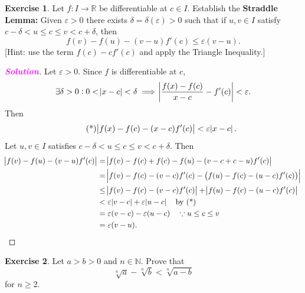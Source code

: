 \documentclass[12pt,openany]{book}
\theoremstyle{definition}
\newtheorem{exercise}{Exercise}[chapter]
\newcommand{\N}{\mathbb{N}}
\newcommand{\R}{\mathbb{R}}
\newcommand{\sol}{\textcolor{magenta}{\bf Solution}}
\begin{document}
	\vspace{20pt}
	\begin{tcolorbox}[colframe=execolor, title={\color{white}\bf}]
		\begin{exercise}
			Let $f:I\to\R$ be differentiable at $c\in I$. Establish the \textbf{Straddle Lemma:}
			Given $\varepsilon>0$ there exists $\delta=\delta(\varepsilon)>0$ such that if $u,v\in I$ satisfy $c-\delta<u\leq c\leq v<c+\delta$, then
			\[
			f(v)-f(u)-(v-u)f'(c)\leq\varepsilon(v-u).
			\]
			\textcolor{gray!50!white}{[Hint: use the term $f(c)-cf'(c)$ and apply the Triangle Inequality.]}
		\end{exercise}
	\end{tcolorbox}
	\begin{proof}[\sol]
		Let $\varepsilon>0$. Since $f$ is differentiable at $c$, \[
		\exists\delta>0: 0<\abs{x-c}<\delta\implies\abs{\frac{f(x)-f(c)}{x-c}-f'(c)}<\varepsilon.
		\] Then \begin{equation*}\tag{*}
		\abs{f(x)-f(c)-(x-c)f'(c)}<\varepsilon\abs{x-c}.
		\end{equation*}
		Let $u,v\in I$ satisfies $c-\delta<u\leq c\leq v<c+\delta$. Then \begin{align*}
			\abs{f(v)-f(u)-(v-u)f'(c)}&=\abs{f(v)-f(c)+f(c)-f(u)-(v-c+c-u)f'(c)}\\
			&=\abs{f(v)-f(c)-(v-c)f'(c)-\del{f(u)-f(c)-(u-c)f'(c)}}\\
			&\leq\abs{f(v)-f(c)-(v-c)f'(c)}+\abs{f(u)-f(c)-(u-c)f'(c)}\\
			&<\varepsilon\abs{v-c}+\varepsilon\abs{u-c}\quad\text{by (*)}\\
			&=\varepsilon(v-c)-\varepsilon(u-c)\quad\because u\leq c\leq v\\
			&=\varepsilon(v-u).
		\end{align*}
	\end{proof}
	\vspace{20pt}
	\newpage
	\begin{tcolorbox}[colframe=execolor, title={\color{white}\bf}]
	\begin{exercise}
		Let $a>b>0$ and $n\in\N$. Prove that \[
		\sqrt[n]{a}-\sqrt[n]{b}<\sqrt[n]{a-b}
		\] for $n\geq 2$.
	\end{exercise}
	\end{tcolorbox}
\end{document}
